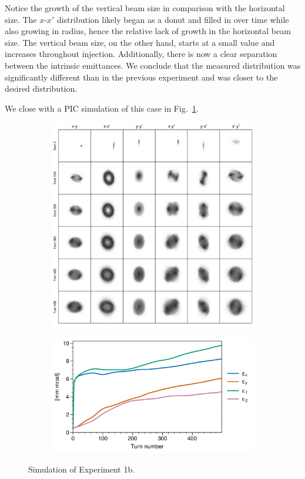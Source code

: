 %
Notice the growth of the vertical beam size in comparison with the horizontal size. The $x$-$x'$ distribution likely began as a donut and filled in over time while also growing in radius, hence the relative lack of growth in the horizontal beam size. The vertical beam size, on the other hand, starts at a small value and increases throughout injection. Additionally, there is now a clear separation between the intrinsic emittances. We conclude that the measured distribution was significantly different than in the previous experiment and was closer to the desired distribution.

We close with a PIC simulation of this case in Fig.~\ref{fig:exp1b_sim}. 
%
\begin{figure}[!p]
    \centering
    \begin{subfigure}{0.85\textwidth}
        \includegraphics[width=\textwidth]{Images/chapter5/exp1b/sim_snapshots.png}
    \end{subfigure}
    \vfill
    \vspace*{1.0cm}
    \vfill
    \begin{subfigure}{0.7\textwidth}
        \includegraphics[width=\textwidth]{Images/chapter5/exp1b/sim_emittances.png}
    \end{subfigure}
    \caption{Simulation of Experiment 1b.}
    \label{fig:exp1b_sim}
\end{figure}
